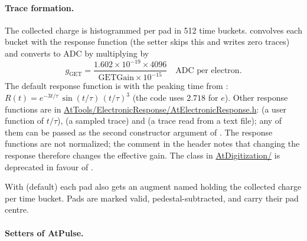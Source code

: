 \paragraph{Trace formation.} The collected charge is histogrammed per pad in 512 time buckets.
 convolves each bucket with the response function
(the setter  skips this and writes zero traces) and  converts to ADC by multiplying
by
\[
g_\mathrm{GET} = \frac{1.602\times10^{-19}\times 4096}{\mathrm{GETGain}\times10^{-15}}
\quad\text{ADC per electron.}
\]
The default response function is  with the peaking time
from :
$R(t) = e^{-3t/\tau}\,\sin(t/\tau)\,(t/\tau)^3$ (the code uses $2.718$ for $e$). Other response
functions are in \url{AtTools/ElectronicResponse/AtElectronicResponse.h}:
 (a user function of $t/\tau$),  (a sampled trace)
and  (a trace read from a text file); any of them can be passed as the second
constructor argument of . The response functions are not normalized; the comment in
the header notes that changing the response therefore changes the effective gain.
The class  in \url{AtDigitization/} is deprecated in favour of
.

With  (default) each pad also gets an augment named  holding the
collected charge per time bucket. Pads are marked valid, pedestal-subtracted, and carry their pad
centre.

\paragraph{Setters of AtPulse.}

